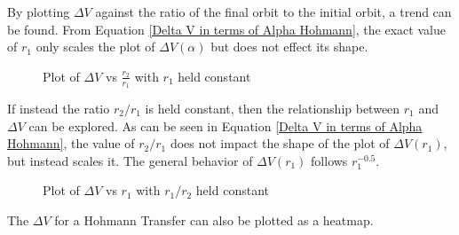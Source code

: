 \documentclass{article}
\begin{document}
By plotting $\Delta V$ against the ratio of the final orbit to the initial orbit, a trend can be found. From Equation \eqref{Delta V in terms of Alpha Hohmann}, the exact value of $r_1$ only scales the plot of $\Delta V(\alpha)$ but does not effect its shape.
\begin{figure}[H]
    \centering
    \def\R{1}
    \caption{Plot of $\Delta V$ vs $\frac{r_2}{r_1}$ with $r_1$ held constant}\label{fig:Hohmann Delta V r1 const}
\end{figure}

If instead the ratio $r_2/r_1$ is held constant, then the relationship between $r_1$ and $\Delta V$ can be explored. As can be seen in Equation \eqref{Delta V in terms of Alpha Hohmann}, the value of $r_2/r_1$ does not impact the shape of the plot of $\Delta V(r_1)$, but instead scales it. The general behavior of $\Delta V(r_1)$ follows $r_1^{-0.5}$.

\begin{figure}[H]
    \centering
    \def\alph{2}
    \caption{Plot of $\Delta V$ vs $r_1$ with $r_1/r_2$ held constant}\label{fig:Hohmann Delta V alpha const}
\end{figure}

The $\Delta V$ for a Hohmann Transfer can also be plotted as a heatmap.
\end{document}
